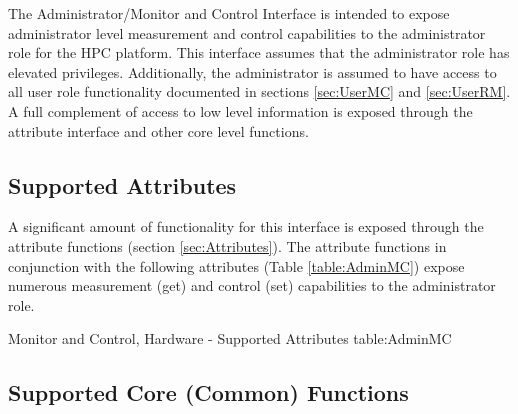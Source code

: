 The Administrator/Monitor and Control Interface is intended to expose administrator level measurement and control capabilities to the administrator role for the HPC platform.
This interface assumes that the administrator role has elevated privileges.
Additionally, the administrator is assumed to have access to all user role functionality documented in sections \ref{sec:UserMC} and \ref{sec:UserRM}.
A full complement of access to low level information is exposed through the attribute interface and other core level functions.


\subsection{Supported Attributes}\label{sec:AdminMCAttributes}
A significant amount of functionality for this interface is exposed through the attribute functions (section \ref{sec:Attributes}).
The attribute functions in conjunction with the following attributes (Table \ref{table:AdminMC}) expose numerous measurement  (get) and control (set) capabilities to the administrator role.

\begin{attributetable}{Monitor and Control, Hardware - Supported Attributes }{table:AdminMC}
	\aPstateDesc
	\aCstateDesc
	\aCstateLimitDesc
	\aSstateDesc
	\aCurrentDesc
	\aVoltageDesc
	\aPowerDesc
	\aMinPowerDesc
	\aMaxPowerDesc
	\aFreqDesc
	\aFreqLimitMinDesc
	\aFreqLimitMaxDesc
	\aEnergyDesc
	\aTempDesc
\end{attributetable}


\subsection{Supported Core (Common) Functions}\label{sec:AdminMCSupportedCommon}

